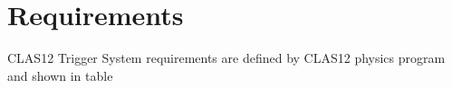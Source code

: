 \section{Requirements}

CLAS12 Trigger System requirements are defined by CLAS12 physics program and shown in table\

